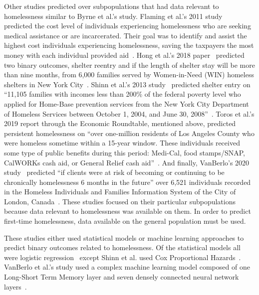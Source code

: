 \documentclass[10pt,letterpaper]{article}
\begin{document}
Other studies predicted over subpopulations that had data relevant to homelessness similar to Byrne et al.'s study. Flaming et al.'s 2011 study~\cite{flaming2011crisis} predicted the cost level of individuals experiencing homelessness who are seeking medical assistance or are incarcerated. Their goal was to identify and assist the highest cost individuals experiencing homelessness, saving the taxpayers the most money with each individual provided aid~\cite{flaming2011crisis}. Hong et al.'s 2018 paper~\cite{hong2018applications} predicted two binary outcomes, shelter reentry and if the length of shelter stay will be more than nine months, from 6,000 families served by Women-in-Need (WIN) homeless shelters in New York City~\cite{hong2018applications}. Shinn et al.'s 2013 study~\cite{shinn2013efficient} predicted shelter entry on ``11,105 families with incomes less than 200\% of the federal poverty level who applied for Home-Base prevention services from the New York City Department of Homeless Services between October 1, 2004, and June 30, 2008''~\cite{shinn2013efficient}. Toros et al.'s 2019 report through the Economic Roundtable, mentioned above, predicted persistent homelessness on ``over one-million residents of Los Angeles County who were homeless sometime within a 15-year window. These  individuals received some type of public benefits during this period: Medi-Cal, food  stamps/SNAP, CalWORKs cash aid, or General Relief cash aid''~\cite{toros2019early}. And finally, VanBerlo's 2020 study~\cite{vanberlo2021interpretable} predicted ``if clients were at risk of becoming or continuing to be chronically homelessness 6 months in the future'' over 6,521 individuals recorded in the Homeless Individuals and Families Information System of the City of London, Canada~\cite{vanberlo2021interpretable}. These studies focused on their particular subpopulations because data relevant to homelessness was available on them. In order to predict first-time homelessness, data available on the general population must be used.

These studies either used statistical models or machine learning approaches to predict binary outcomes related to homelessness. Of the statistical models all were logistic regression~\cite{byrne2020classification,flaming2011crisis,hong2018applications,toros2019early} except Shinn et al. used Cox Proportional Hazards~\cite{shinn2013efficient}. VanBerlo et al.'s study used a complex machine learning model composed of one Long-Short Term Memory layer and seven densely connected neural network layers~\cite{vanberlo2021interpretable}. 
\end{document}
